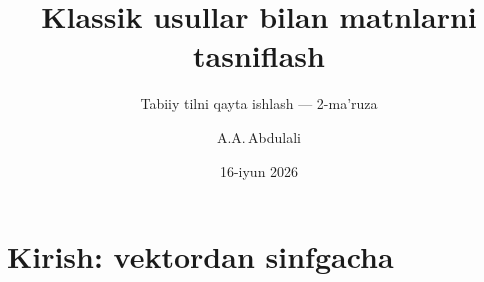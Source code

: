 \documentclass[aspectratio=169,11pt]{beamer}
\title[Klassik Tasnif]{Klassik usullar bilan matnlarni tasniflash}
\subtitle{Tabiiy tilni qayta ishlash --- 2-ma'ruza}
\author[A.A.\,Abdulali]{A.A.\,Abdulali}
\date{16-iyun 2026}
\institute{11:00--12:20 \quad$\cdot$\quad  mavzu \textnumero{}2}
\begin{document}

\maketitle

\section[Kirish]{Kirish: vektordan sinfgacha}

\end{document}
